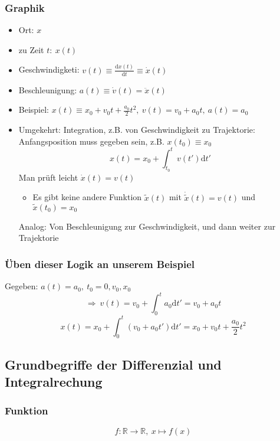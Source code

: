 \documentclass[a4paper]{scrartcl}
\theoremstyle{definition}
\theoremstyle{plain}
\theoremstyle{remark}
\begin{document}
\subsubsection{Graphik}
\label{sec-2-1-1}
\begin{itemize}
\item Ort: $x$
\item zu Zeit $t:~x(t)$
\item Geschwindigketi: $v(t) \equiv \frac{\mathrm{d}x(t)}{\mathrm{d}t} \equiv \dot{x}(t)$
\item Beschleunigung: $a(t) \equiv \dot{v}(t) = \ddot{x}(t)$
\item Beispiel: $x(t) \equiv x_0 + v_0 t + \frac{a_0}{2}t^2, ~v(t) = v_0 + a_0 t,~a(t) = a_0$
\item Umgekehrt: Integration, z.B. von Geschwindigkeit zu Trajektorie: Anfangsposition muss gegeben sein, z.B. $x(t_0) \equiv x_0$
     \[x(t)=x_0 + \int_{t_0}^{t}v(t')\mathrm{d}t'\]
     Man prüft leicht $\dot{x}(t) = v(t)$
\begin{itemize}
\item Es gibt keine andere Funktion $\tilde{x}(t)$ mit $\dot{\tilde{x}}(t) = v(t)$ und $\tilde{x}(t_0) = x_0$
\end{itemize}
Analog: Von Beschleunigung zur Geschwindigkeit, und dann weiter zur Trajektorie
\end{itemize}
\subsubsection{Üben dieser Logik an unserem Beispiel}
\label{sec-2-1-2}
Gegeben: $a(t) = a_0,~t_0=0,v_0,x_0$ \\
    \[\Rightarrow~v(t) = v_0 + \int_0^t a_0\mathrm{d}t' = v_0 + a_0 t\]
\[x(t) = x_0 + \int_0^t (v_0 + a_0 t')\mathrm{d}t' = x_0 + v_0 t + \frac{a_0}{2}t^2\]
\subsection{Grundbegriffe der Differenzial und Integralrechung}
\label{sec-2-2}
\subsubsection{Funktion}
\label{sec-2-2-1}
\[f: \mathbb{R} \rightarrow \mathbb{R},~x \mapsto f(x)\]
\end{document}
